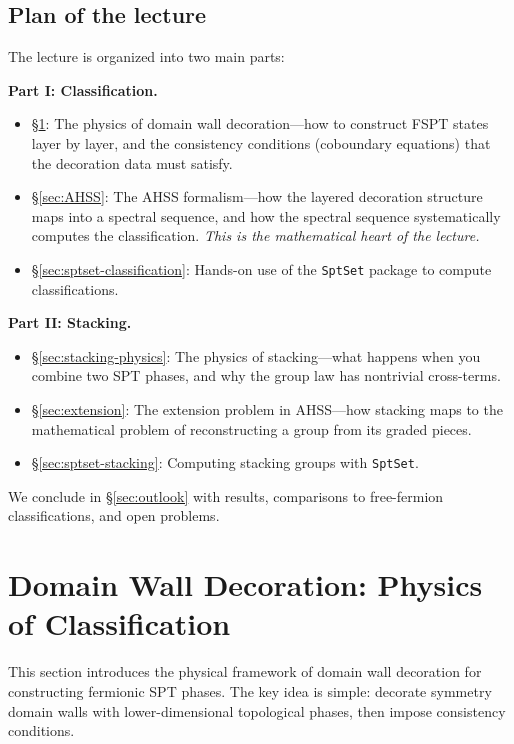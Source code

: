 \documentclass{SciPost}
\theoremstyle{definition}
\begin{document}
\subsection{Plan of the lecture}

The lecture is organized into two main parts:

\medskip
\noindent\textbf{Part I: Classification.}
\begin{itemize}
    \item \S\ref{sec:decoration}: The physics of domain wall decoration---how to construct FSPT states layer by layer, and the consistency conditions (coboundary equations) that the decoration data must satisfy.
    \item \S\ref{sec:AHSS}: The AHSS formalism---how the layered decoration structure maps into a spectral sequence, and how the spectral sequence systematically computes the classification. \emph{This is the mathematical heart of the lecture.}
    \item \S\ref{sec:sptset-classification}: Hands-on use of the \texttt{SptSet} package to compute classifications.
\end{itemize}

\medskip
\noindent\textbf{Part II: Stacking.}
\begin{itemize}
    \item \S\ref{sec:stacking-physics}: The physics of stacking---what happens when you combine two SPT phases, and why the group law has nontrivial cross-terms.
    \item \S\ref{sec:extension}: The extension problem in AHSS---how stacking maps to the mathematical problem of reconstructing a group from its graded pieces.
    \item \S\ref{sec:sptset-stacking}: Computing stacking groups with \texttt{SptSet}.
\end{itemize}

\medskip
\noindent We conclude in \S\ref{sec:outlook} with results, comparisons to free-fermion classifications, and open problems.


\section{Domain Wall Decoration: Physics of Classification}
\label{sec:decoration}

This section introduces the physical framework of domain wall decoration for constructing fermionic SPT phases.
The key idea is simple: decorate symmetry domain walls with lower-dimensional topological phases, then impose consistency conditions.
\end{document}

